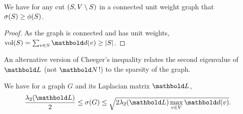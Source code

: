 \begin{lem}
We have for any cut $(S, V \setminus S)$ in a connected unit weight graph that $\sigma(S) \geq \phi(S)$.
\end{lem}
\begin{proof}
As the graph is connected and has unit weights, $\vol(\sS) = \sum_{v \in \sS} \vd(v) \geq |\sS|$.
\end{proof}

An alternative version of Cheeger's inequality relates the second eigenvalue of $\mL$ (not $\mN$!) to the sparsity of the graph.

\begin{fct} We have for a graph $G$ and its Laplacian matrix $\mL$, \begin{align}
    \frac{\lambda_2(\mL)}{2} \leq \sigma(G) \leq \sqrt{2 \lambda_2(\mL) \max_{v \in \sV} \vd(v)}.
\end{align}
\end{fct}